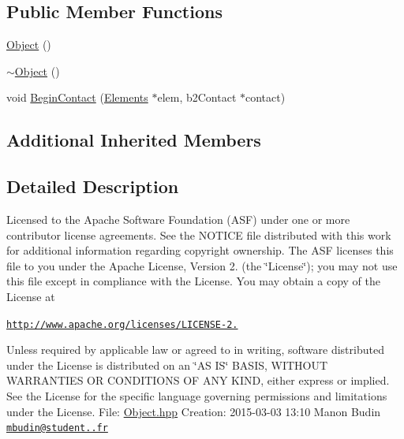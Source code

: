 \subsection*{Public Member Functions}
\begin{DoxyCompactItemize}
\item 
\hyperlink{class_object_a40860402e64d8008fb42329df7097cdb}{Object} ()
\item 
\hyperlink{class_object_ae8f5483f459e46687bd01e6f9977afd3}{$\sim$\-Object} ()
\item 
void \hyperlink{class_object_a5681745b50d64994e00fe519bbb4cd31}{Begin\-Contact} (\hyperlink{class_elements}{Elements} $\ast$elem, b2\-Contact $\ast$contact)
\end{DoxyCompactItemize}
\subsection*{Additional Inherited Members}


\subsection{Detailed Description}
Licensed to the Apache Software Foundation (A\-S\-F) under one or more contributor license agreements. See the N\-O\-T\-I\-C\-E file distributed with this work for additional information regarding copyright ownership. The A\-S\-F licenses this file to you under the Apache License, Version 2. (the \char`\"{}\-License\char`\"{}); you may not use this file except in compliance with the License. You may obtain a copy of the License at

\href{http://www.apache.org/licenses/LICENSE-2.0}{\tt http\-://www.\-apache.\-org/licenses/\-L\-I\-C\-E\-N\-S\-E-\/2.}

Unless required by applicable law or agreed to in writing, software distributed under the License is distributed on an \char`\"{}\-A\-S I\-S\char`\"{} B\-A\-S\-I\-S, W\-I\-T\-H\-O\-U\-T W\-A\-R\-R\-A\-N\-T\-I\-E\-S O\-R C\-O\-N\-D\-I\-T\-I\-O\-N\-S O\-F A\-N\-Y K\-I\-N\-D, either express or implied. See the License for the specific language governing permissions and limitations under the License. File\-: \hyperlink{_object_8hpp}{Object.\-hpp} Creation\-: 2015-\/03-\/03 13\-:10 Manon Budin \href{mailto:mbudin@student.42.fr}{\tt mbudin@student..\-fr} 

